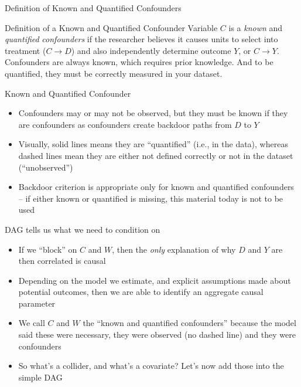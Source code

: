 \documentclass{beamer}
\begin{document}
\begin{frame}{Definition of Known and Quantified Confounders}
	
	
	\begin{block}{Definition of a Known and Quantified Confounder}
	Variable $C$ is a \emph{known} and \emph{quantified} \emph{confounders} if the researcher believes it causes units to select into treatment ($C \rightarrow D$) and also independently determine outcome $Y$, or $C \rightarrow Y$. Confounders are always known, which requires prior knowledge. And to be quantified, they must be correctly measured in your dataset.
	\end{block}
	
	
\end{frame}

\begin{frame}{Known and Quantified Confounder}

	\begin{itemize}
	\item Confounders may or may not be observed, but they must be known if they are confounders as confounders create backdoor paths from $D$ to $Y$
	\item Visually, solid lines means they are ``quantified'' (i.e., in the data), whereas dashed lines mean they are either not defined correctly or not in the dataset (``unobserved'')
	\item Backdoor criterion is appropriate only for known and quantified confounders -- if either known or quantified is missing, this material today is not to be used
	\end{itemize}

\end{frame}

\begin{frame}{DAG tells us what we need to condition on}

\begin{itemize}

\item If we ``block'' on $C$ and $W$, then the \emph{only} explanation of why $D$ and $Y$ are then correlated is causal
\item Depending on the model we estimate, and explicit assumptions made about potential outcomes, then we are able to identify an aggregate causal parameter
\item We call $C$ and $W$ the ``known and quantified confounders'' because the model said these were necessary, they were observed (no dashed line) and they were confounders
\item So what's a collider, and what's a covariate? Let's now add those into the simple DAG

\end{itemize}

\end{frame}
\end{document}
